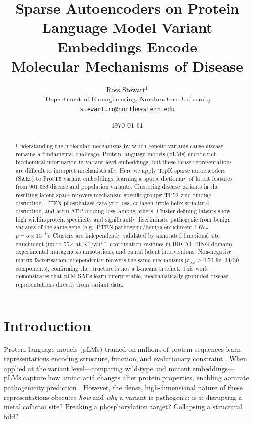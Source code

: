 \documentclass[10pt]{article}
\title{\textbf{Sparse Autoencoders on Protein Language Model Variant Embeddings Encode\\
       Molecular Mechanisms of Disease}}
\author{%
  Ross Stewart$^{1}$%
  \\[4pt]
  \small $^{1}$Department of Bioengineering, Northeastern University\\
  \small \texttt{stewart.ro@northeastern.edu}
}
\date{\today}
\begin{document}
\maketitle

\begin{abstract}
Understanding the molecular mechanisms by which genetic variants cause disease remains a
fundamental challenge. Protein language models (pLMs) encode rich biochemical information in
variant-level embeddings, but these dense representations are difficult to interpret
mechanistically. Here we apply TopK sparse autoencoders (SAEs) to ProtT5 variant embeddings,
learning a sparse dictionary of latent features from 901,586 disease and population variants.
Clustering disease variants in the resulting latent space recovers mechanism-specific groups:
TP53 zinc-binding disruption, PTEN phosphatase catalytic loss, collagen triple-helix
structural disruption, and actin ATP-binding loss, among others. Cluster-defining latents
show high within-protein specificity and significantly discriminate pathogenic from benign
variants of the same gene (e.g., PTEN pathogenic/benign enrichment 1.67$\times$,
$p = 5\times10^{-6}$). Clusters are independently validated by annotated functional site
enrichment (up to 55$\times$ at K$^+$/Zn$^{2+}$ coordination residues in BRCA1 RING domain),
experimental mutagenesis annotations, and causal latent interventions. Non-negative matrix
factorisation independently recovers the same mechanisms ($r_\text{cos} \geq 0.50$ for 34/50
components), confirming the structure is not a k-means artefact. This work demonstrates that pLM SAEs learn
interpretable, mechanistically grounded disease representations directly from variant data.
\end{abstract}

\section{Introduction}

Protein language models (pLMs) trained on millions of protein sequences learn representations
encoding structure, function, and evolutionary constraint
\citep{elnaggar2021prottrans,meier2021language}. When applied at the variant level---comparing
wild-type and mutant embeddings---pLMs capture how amino acid changes alter protein properties,
enabling accurate pathogenicity prediction \citep{brandes2023genome,notin2023proteingym}.
However, the dense, high-dimensional nature of these representations obscures \emph{how} and
\emph{why} a variant is pathogenic: is it disrupting a metal cofactor site? Breaking a
phosphorylation target? Collapsing a structural fold?
\end{document}
